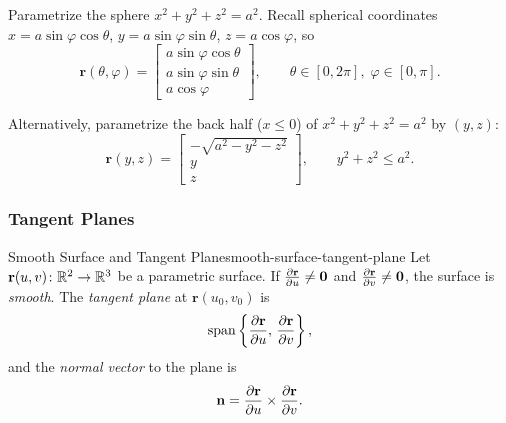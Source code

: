 \begin{example}[Sphere]
  Parametrize the sphere $x^2+y^2+z^2 = a^2$. Recall spherical coordinates
  $x = a\sin\varphi\cos\theta$, $y = a\sin\varphi\sin\theta$, $z = a\cos\varphi$, so
  \[
    \mathbf{r}(\theta,\varphi) =
    \begin{bmatrix}
      a\sin\varphi\cos\theta \\
      a\sin\varphi\sin\theta \\
      a\cos\varphi
    \end{bmatrix}
    ,\qquad \theta\in[0,2\pi],\;\varphi\in[0,\pi].
  \]

  Alternatively, parametrize the back half ($x\leq 0$) of $x^2+y^2+z^2 = a^2$ by $(y,z)$:
  \[
    \mathbf{r}(y,z) =
    \begin{bmatrix}
      -\sqrt{a^2-y^2-z^2} \\
      y                   \\
      z
    \end{bmatrix}
    ,\qquad y^2+z^2\leq a^2.
  \]
\end{example}

\subsubsection{Tangent Planes}

\begin{definition}{Smooth Surface and Tangent Plane}{smooth-surface-tangent-plane}
  Let $\mathbf{r}(u,v)\colon\mathbb{R}^2\to\mathbb{R}^3$ be a parametric surface. If
  $\frac{\partial \mathbf{r}}{\partial u}\neq\mathbf{0}$ and $\frac{\partial \mathbf{r}}{\partial v}\neq\mathbf{0}$, the surface is
  \emph{smooth}. The \emph{tangent plane} at $\mathbf{r}(u_0,v_0)$ is
  \[
    \operatorname{span}\left\{\frac{\partial \mathbf{r}}{\partial u},\,\frac{\partial \mathbf{r}}{\partial v}\right\},
  \]
  and the \emph{normal vector} to the plane is
  \[
    \mathbf{n} = \frac{\partial \mathbf{r}}{\partial u}\times\frac{\partial \mathbf{r}}{\partial v}.
  \]
\end{definition}

\begin{center}
\end{center}

